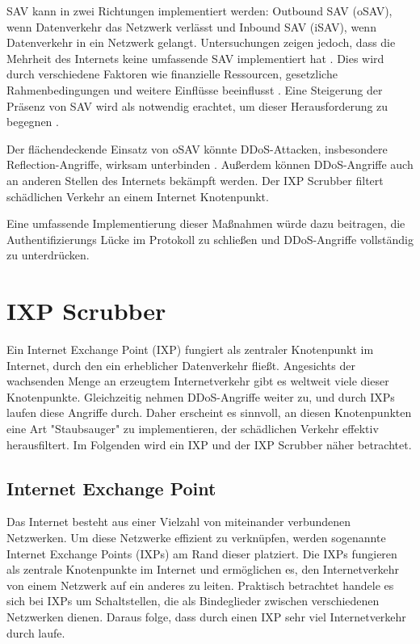 \documentclass[sigplan,screen]{acmart}
\begin{document}
SAV kann in zwei Richtungen implementiert werden: Outbound SAV (oSAV), wenn Datenverkehr das Netzwerk verlässt und Inbound SAV (iSAV), wenn Datenverkehr in ein Netzwerk gelangt. Untersuchungen zeigen jedoch, dass die Mehrheit des Internets keine umfassende SAV implementiert hat \cite{Spoofer01} \cite{CRP01}. Dies wird durch verschiedene Faktoren wie finanzielle Ressourcen, gesetzliche Rahmenbedingungen und weitere Einflüsse beeinflusst \cite{Hal01}. Eine Steigerung der Präsenz von SAV wird als notwendig erachtet, um dieser Herausforderung zu begegnen \cite{manrs01}.

Der flächendeckende Einsatz von oSAV könnte DDoS-Attacken, insbesondere Reflection-Angriffe, wirksam unterbinden \cite{FrontDoor01}. Außerdem können DDoS-Angriffe auch an anderen Stellen des Internets bekämpft werden. Der IXP Scrubber \cite{Hohlfeld01} filtert schädlichen Verkehr an einem Internet Knotenpunkt.

Eine umfassende Implementierung dieser Maßnahmen würde dazu beitragen, die Authentifizierungs Lücke im Protokoll zu schließen und DDoS-Angriffe vollständig zu unterdrücken.

\section{IXP Scrubber}
Ein Internet Exchange Point (IXP) fungiert als zentraler Knotenpunkt im Internet, durch den ein erheblicher Datenverkehr fließt. Angesichts der wachsenden Menge an erzeugtem Internetverkehr gibt es weltweit viele dieser Knotenpunkte. Gleichzeitig nehmen DDoS-Angriffe weiter zu, und durch IXPs laufen diese Angriffe durch. Daher erscheint es sinnvoll, an diesen Knotenpunkten eine Art "Staubsauger" zu implementieren, der schädlichen Verkehr effektiv herausfiltert. Im Folgenden wird ein IXP und der IXP Scrubber näher betrachtet.

\subsection{Internet Exchange Point}
Das Internet besteht aus einer Vielzahl von miteinander verbundenen Netzwerken. Um diese Netzwerke effizient zu verknüpfen, werden sogenannte Internet Exchange Points (IXPs) am Rand dieser platziert. Die IXPs fungieren als zentrale Knotenpunkte im Internet und ermöglichen es, den Internetverkehr von einem Netzwerk auf ein anderes zu leiten. Praktisch betrachtet handele es sich bei IXPs um Schaltstellen, die als Bindeglieder zwischen verschiedenen Netzwerken dienen. Daraus folge, dass durch einen IXP sehr viel Internetverkehr durch laufe.
\end{document}
